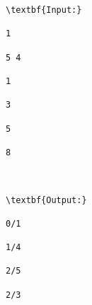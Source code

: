 \begin{verbatim}
\textbf{Input:}

1

5 4

1

3

5

8



\textbf{Output:}

0/1

1/4

2/5

2/3

\end{verbatim}